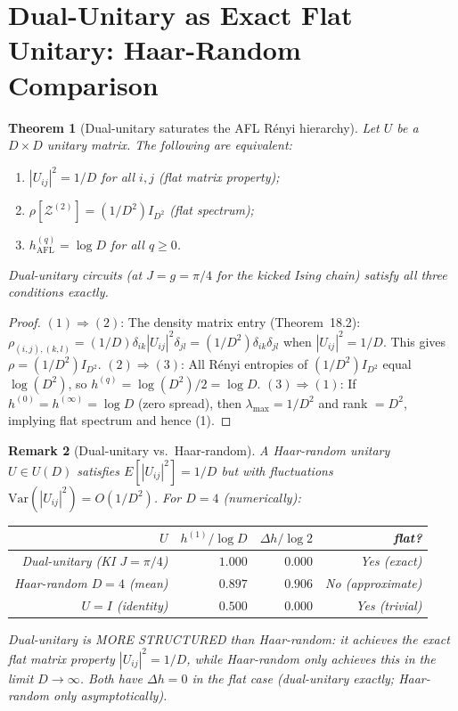 \documentclass[12pt,a4paper]{article}
\newtheorem{theorem}{Theorem}[section]
\newtheorem{remark}[theorem]{Remark}
\begin{document}
\section{Dual-Unitary as Exact Flat Unitary: Haar-Random Comparison}
\label{sec:dual_unitary_flat}

\begin{theorem}[Dual-unitary saturates the AFL Rényi hierarchy]
  \label{thm:du_saturates}
  Let $U$ be a $D\times D$ unitary matrix.  The following are equivalent:
  \begin{enumerate}
    \item $|U_{ij}|^2 = 1/D$ for all $i,j$ (\emph{flat matrix property});
    \item $\rho[\mathcal{Z}^{(2)}] = (1/D^2)I_{D^2}$ (\emph{flat spectrum});
    \item $h_{\mathrm{AFL}}^{(q)} = \log D$ for \emph{all} $q\geq 0$.
  \end{enumerate}
  Dual-unitary circuits (at $J=g=\pi/4$ for the kicked Ising chain)
  satisfy all three conditions exactly.
\end{theorem}
\begin{proof}
  $(1)\Rightarrow(2)$: The density matrix entry (Theorem~18.2):
  $\rho_{(i,j),(k,l)} = (1/D)\delta_{ik}|U_{ij}|^2\delta_{jl} = (1/D^2)\delta_{ik}\delta_{jl}$
  when $|U_{ij}|^2 = 1/D$.  This gives $\rho = (1/D^2)I_{D^2}$.
  $(2)\Rightarrow(3)$: All R\'enyi entropies of $(1/D^2)I_{D^2}$ equal $\log(D^2)$,
  so $h^{(q)} = \log(D^2)/2 = \log D$.
  $(3)\Rightarrow(1)$: If $h^{(0)} = h^{(\infty)} = \log D$ (zero spread), then
  $\lambda_{\max} = 1/D^2$ and rank $= D^2$, implying flat spectrum and hence (1).
\end{proof}

\begin{remark}[Dual-unitary vs.\ Haar-random]
  A Haar-random unitary $U\in U(D)$ satisfies $E[|U_{ij}|^2] = 1/D$ but with
  fluctuations $\mathrm{Var}(|U_{ij}|^2) = O(1/D^2)$.  For $D=4$ (numerically):
  \begin{center}
  \begin{tabular}{r|rrr}
  \hline
  $U$ & $h^{(1)}/\log D$ & $\Delta h/\log 2$ & flat? \\
  \hline
  Dual-unitary (KI $J=\pi/4$) & $1.000$ & $0.000$ & Yes (exact) \\
  Haar-random $D=4$ (mean)     & $0.897$ & $0.906$ & No (approximate) \\
  $U=I$ (identity)             & $0.500$ & $0.000$ & Yes (trivial) \\
  \hline
  \end{tabular}
  \end{center}
  Dual-unitary is MORE STRUCTURED than Haar-random: it achieves the
  exact flat matrix property $|U_{ij}|^2 = 1/D$, while Haar-random only
  achieves this in the limit $D\to\infty$.  Both have $\Delta h = 0$ in the
  flat case (dual-unitary exactly; Haar-random only asymptotically).
\end{remark}
\end{document}

